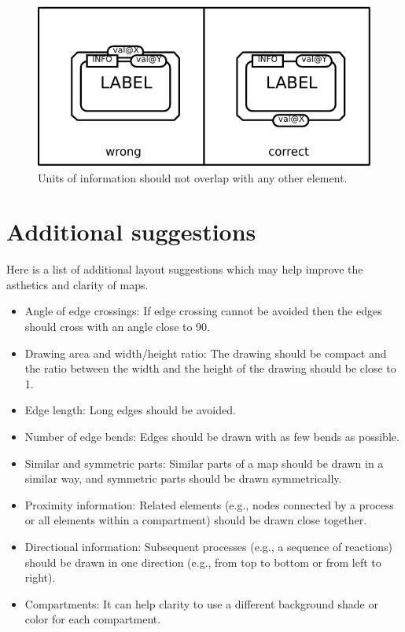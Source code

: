\begin{figure}[htb]
  \centering
  \includegraphics[scale=0.8]{images/build/layout_unit_information.pdf}
  \caption{Units of information should not overlap with any
  other element.}\label{fig:layout7}
\end{figure}

\section{Additional suggestions}

Here is a list of additional layout suggestions which may help improve the asthetics and clarity of \PD maps.

\begin{itemize}
  \item Angle of edge crossings: If edge crossing cannot be avoided then the edges should cross with an angle close to 90\degree.
 \item Drawing area and width/height ratio: The drawing should
  be compact and the ratio between the width and the height
  of the drawing should be close to 1.
  \item Edge length: Long edges should be avoided.
  \item Number of edge bends: Edges should be drawn with
  as few bends as possible.
  \item Similar and symmetric parts: Similar parts of a map
  should be drawn in a similar way, and symmetric parts
  should be drawn symmetrically.
  \item Proximity information: Related elements (e.g., nodes
  connected by a process or all elements within a compartment)
  should be drawn close together.
  \item Directional information: Subsequent processes (e.g., a sequence
  of reactions) should be drawn in one direction (e.g., from
  top to bottom or from left to right).
  \item Compartments: It can help clarity to use a different background shade or color for each compartment.
\end{itemize}
